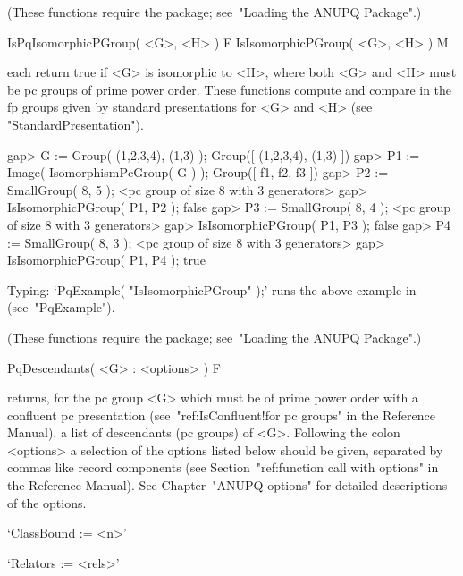 (These functions require the {\ANUPQ}  package;  see~"Loading  the  ANUPQ
Package".)


\>IsPqIsomorphicPGroup( <G>, <H> ) F
\>IsIsomorphicPGroup( <G>, <H> ) M

each return true if <G> is isomorphic to <H>, where both <G> and <H> must
be pc groups of prime power order. These functions  compute  and  compare
in {\GAP} the fp groups given by standard presentations for <G>  and  <H>
(see "StandardPresentation").

\beginexample
gap> G := Group( (1,2,3,4), (1,3) );
Group([ (1,2,3,4), (1,3) ])
gap> P1 := Image( IsomorphismPcGroup( G ) );
Group([ f1, f2, f3 ])
gap> P2 := SmallGroup( 8, 5 );
<pc group of size 8 with 3 generators>
gap> IsIsomorphicPGroup( P1, P2 );
false
gap> P3 := SmallGroup( 8, 4 );
<pc group of size 8 with 3 generators>
gap> IsIsomorphicPGroup( P1, P3 );
false
gap> P4 := SmallGroup( 8, 3 );
<pc group of size 8 with 3 generators>
gap> IsIsomorphicPGroup( P1, P4 );
true
\endexample

Typing: `PqExample( "IsIsomorphicPGroup" );' runs the  above  example  in
{\GAP} (see~"PqExample").

(These functions require the {\ANUPQ}  package;  see~"Loading  the  ANUPQ
Package".)


\>PqDescendants( <G> : <options> ) F

returns, for the pc group <G> which must be of prime power order  with  a
confluent pc presentation (see~"ref:IsConfluent!for  pc  groups"  in  the
{\GAP} Reference Manual), a list  of  descendants  (pc  groups)  of  <G>.
Following the colon <options> a selection of  the  options  listed  below
should  be  given,  separated  by  commas  like  record  components  (see
Section~"ref:function call with options" in the {\GAP} Reference Manual).
See Chapter~"ANUPQ options" for detailed descriptions of the options.

\beginlist%

\item{}`ClassBound := <n>'

\item{}`Relators := <rels>'


